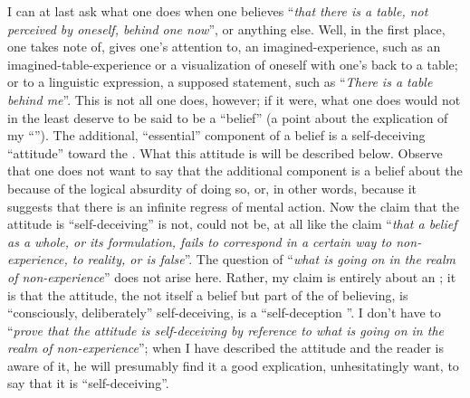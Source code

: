 I can at last ask what one does when one believes \enquote{\emph{that there is a table, not perceived by oneself, behind one now}}, or anything else. Well, in the first place, one takes note of, gives one's attention to, an imagined-experience, such as an imagined-table-experience or a visualization of oneself with one's back to a table; or to a linguistic expression, a supposed statement, such as \enquote{\emph{There is a table behind me}}. This is not all one does, however; if it were, what one does would not in the least deserve to be said to be a \enquote{belief} (a point about the explication of my \enquote{}). The additional, \enquote{essential} component of a belief is a self-deceiving \enquote{attitude} toward the . What this attitude is will be described below. Observe that one does not want to say that the additional component is a belief about the  because of the logical absurdity of doing so, or, in other words, because it suggests that there is an infinite regress of mental action. Now the claim that the attitude is \enquote{self-deceiving} is not, could not be, at all like the claim \enquote{\emph{that a belief as a whole, or its formulation, fails to correspond in a certain way to non-experience, to reality, or is false}}. The question of \enquote{\emph{what is going on in the realm of non-experience}} does not arise here. Rather, my claim is entirely about an ; it is that the attitude, the  not itself a belief but part of the  of believing, is \enquote{consciously, deliberately} self-deceiving, is a \enquote{self-deception }. I don't have to \enquote{\emph{prove that the attitude is self-deceiving by reference to what is going on in the realm of non-experience}}; when I have described the attitude and the reader is aware of it, he will presumably find it a good explication, unhesitatingly want, to say that it is \enquote{self-deceiving}. 

